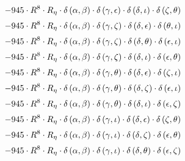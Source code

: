 \begin{subequations}
\begin{gather}
 \\[0.2em] \notag 		 - 945 \cdot R^{8} \cdot R_{\eta{}} \cdot \delta{}\left(\alpha{}, \beta{}\right) \cdot \delta{}\left(\gamma{}, \epsilon{}\right) \cdot \delta{}\left(\delta{}, \iota{}\right) \cdot \delta{}\left(\zeta{}, \theta{}\right) 
 \\[0.2em] \notag 		 - 945 \cdot R^{8} \cdot R_{\eta{}} \cdot \delta{}\left(\alpha{}, \beta{}\right) \cdot \delta{}\left(\gamma{}, \zeta{}\right) \cdot \delta{}\left(\delta{}, \epsilon{}\right) \cdot \delta{}\left(\theta{}, \iota{}\right) 
 \\[0.2em] \notag 		 - 945 \cdot R^{8} \cdot R_{\eta{}} \cdot \delta{}\left(\alpha{}, \beta{}\right) \cdot \delta{}\left(\gamma{}, \zeta{}\right) \cdot \delta{}\left(\delta{}, \theta{}\right) \cdot \delta{}\left(\epsilon{}, \iota{}\right) 
 \\[0.2em] \notag 		 - 945 \cdot R^{8} \cdot R_{\eta{}} \cdot \delta{}\left(\alpha{}, \beta{}\right) \cdot \delta{}\left(\gamma{}, \zeta{}\right) \cdot \delta{}\left(\delta{}, \iota{}\right) \cdot \delta{}\left(\epsilon{}, \theta{}\right) 
 \\[0.2em] \notag 		 - 945 \cdot R^{8} \cdot R_{\eta{}} \cdot \delta{}\left(\alpha{}, \beta{}\right) \cdot \delta{}\left(\gamma{}, \theta{}\right) \cdot \delta{}\left(\delta{}, \epsilon{}\right) \cdot \delta{}\left(\zeta{}, \iota{}\right) 
 \\[0.2em] \notag 		 - 945 \cdot R^{8} \cdot R_{\eta{}} \cdot \delta{}\left(\alpha{}, \beta{}\right) \cdot \delta{}\left(\gamma{}, \theta{}\right) \cdot \delta{}\left(\delta{}, \zeta{}\right) \cdot \delta{}\left(\epsilon{}, \iota{}\right) 
 \\[0.2em] \notag 		 - 945 \cdot R^{8} \cdot R_{\eta{}} \cdot \delta{}\left(\alpha{}, \beta{}\right) \cdot \delta{}\left(\gamma{}, \theta{}\right) \cdot \delta{}\left(\delta{}, \iota{}\right) \cdot \delta{}\left(\epsilon{}, \zeta{}\right) 
 \\[0.2em] \notag 		 - 945 \cdot R^{8} \cdot R_{\eta{}} \cdot \delta{}\left(\alpha{}, \beta{}\right) \cdot \delta{}\left(\gamma{}, \iota{}\right) \cdot \delta{}\left(\delta{}, \epsilon{}\right) \cdot \delta{}\left(\zeta{}, \theta{}\right) 
 \\[0.2em] \notag 		 - 945 \cdot R^{8} \cdot R_{\eta{}} \cdot \delta{}\left(\alpha{}, \beta{}\right) \cdot \delta{}\left(\gamma{}, \iota{}\right) \cdot \delta{}\left(\delta{}, \zeta{}\right) \cdot \delta{}\left(\epsilon{}, \theta{}\right) 
 \\[0.2em] \notag 		 - 945 \cdot R^{8} \cdot R_{\eta{}} \cdot \delta{}\left(\alpha{}, \beta{}\right) \cdot \delta{}\left(\gamma{}, \iota{}\right) \cdot \delta{}\left(\delta{}, \theta{}\right) \cdot \delta{}\left(\epsilon{}, \zeta{}\right) 

\end{gather}
\end{subequations}
